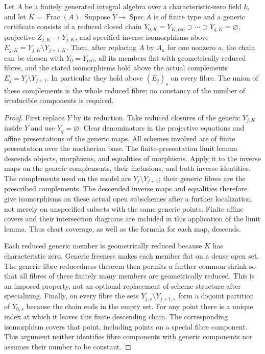 \begin{lemma}\label{lem:finite-diagram}
Let $A$ be a finitely generated integral algebra over a characteristic-zero
field $k$, and let $K=\operatorname{Frac}(A)$. Suppose $Y\to\operatorname{Spec}A$
is of finite type and a generic certificate consists of a reduced closed
chain $Y_{0,K}=Y_{K,\mathrm{red}}\supset\cdots\supset Y_{q,K}=\varnothing$,
projective $Z_{j,K}\to Y_{j,K}$, and specified inverse isomorphisms above
$E_{j,K}=Y_{j,K}\setminus Y_{j+1,K}$. Then, after replacing $A$ by $A_a$
for one nonzero $a$, the chain can be chosen with $Y_0=Y_{\mathrm{red}}$,
all its members flat with geometrically reduced fibres, and the stated
isomorphisms hold above the actual complements
$E_j=Y_j\setminus Y_{j+1}$. In particular they hold above $(E_j)_s$ on
every fibre. The union of these complements is the whole reduced fibre;
no constancy of the number of irreducible components is required.
\end{lemma}
\begin{proof}
First replace $Y$ by its reduction. Take reduced closures of the generic
$Y_{j,K}$ inside $Y$ and use $Y_q=\varnothing$. Clear denominators in
the projective equations and affine presentations of the generic maps.
All schemes involved are of finite presentation over the noetherian
base. The finite-presentation limit lemma
\cite[Tag 01ZM, Lemma 32.10.1(1)--(3)]{Stacks} descends objects,
morphisms, and equalities of morphisms. Apply it to the inverse maps on
the generic complements, their inclusions, and both inverse identities.
The complements used on the model are $Y_j\setminus Y_{j+1}$; their
generic fibres are the prescribed complements. The descended inverse
maps and equalities therefore give isomorphisms on these actual open
subschemes after a further localization, not merely on unspecified
subsets with the same generic points. Finite affine covers and their
intersection diagrams are included in this application of the limit
lemma. Thus chart coverage, as well as the formula for each map, descends.

Each reduced generic member is geometrically reduced because $K$ has
characteristic zero. Generic freeness makes each member flat on a dense
open set. The generic-fibre reducedness theorem
\cite[Section 37.26, Lemma 37.26.4]{Stacks} then permits a further common
shrink so that all fibres of these finitely many members are geometrically
reduced. This is an imposed property, not an optional replacement of
scheme structure after specializing. Finally, on every fibre the sets
$Y_{j,s}\setminus Y_{j+1,s}$ form a disjoint partition of $Y_{0,s}$
because the chain ends in the empty set. For any point there is a unique
index at which it leaves this finite descending chain. The corresponding
isomorphism covers that point, including points on a special fibre
component. This argument neither identifies fibre components with generic
components nor assumes their number to be constant.
\end{proof}

